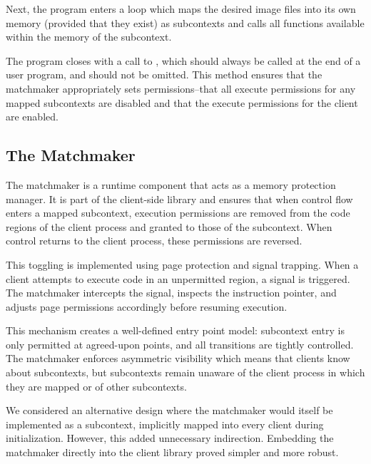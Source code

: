 Next, the program enters a loop which maps the desired image files into its own memory (provided that they exist) as subcontexts and calls all functions available within the memory of the subcontext.

The program closes with a call to , which should always be called at the end of a user program, and should not be omitted. This method ensures that the matchmaker appropriately sets permissions--that all execute permissions for any mapped subcontexts are disabled and that the execute permissions for the client are enabled.

\subsection*{The Matchmaker}
The matchmaker is a runtime component that acts as a memory protection manager. It is part of the client-side library and ensures that when control flow enters a mapped subcontext, execution permissions are removed from the code regions of the client process and granted to those of the subcontext. When control returns to the client process, these permissions are reversed.

This toggling is implemented using page protection and signal trapping. When a client attempts to execute code in an unpermitted region, a  signal is triggered. The matchmaker intercepts the signal, inspects the instruction pointer, and adjusts page permissions accordingly before resuming execution.

This mechanism creates a well-defined entry point model: subcontext entry is only permitted at agreed-upon points, and all transitions are tightly controlled. The matchmaker enforces asymmetric visibility which means that clients know about subcontexts, but subcontexts remain unaware of the client process in which they are mapped or of other subcontexts.

We considered an alternative design where the matchmaker would itself be implemented as a subcontext, implicitly mapped into every client during initialization. However, this added unnecessary indirection. Embedding the matchmaker directly into the client library proved simpler and more robust.